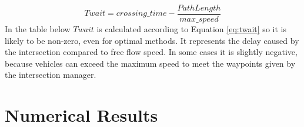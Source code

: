 \documentclass[11pt]{article} %
\begin{document}
\begin{equation}
\label{eq:twait}
Twait = crossing\_time - \frac{PathLength}{max\_speed} 
\end{equation}
In the table below $Twait$ is calculated according to Equation \ref{eq:twait} so it is likely to be non-zero, even for optimal methods. It represents the delay caused by the intersection compared to free flow speed. In some cases it is slightly negative, because vehicles can exceed the maximum speed to meet the waypoints given by the intersection manager.   
\section{Numerical Results}
\label{sec:num_res}


\end{document}
